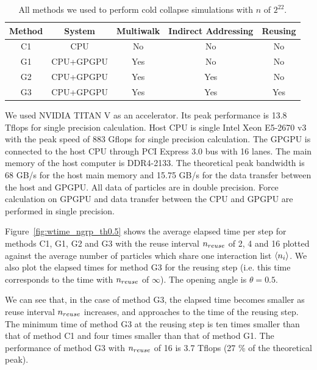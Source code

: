 \documentclass[dvipdfmx]{pasj01}
\begin{document}
\begin{table}
  \begin{tabular}{ccccc}
    \toprule
     Method    & System   & Multiwalk  & Indirect Addressing & Reusing \\
     \midrule
     C1        & CPU        & No         & No               & No        \\
     G1        & CPU+GPGPU  & Yes        & No               & No        \\
     G2        & CPU+GPGPU  & Yes        & Yes              & No       \\
     G3        & CPU+GPGPU  & Yes        & Yes              & Yes       \\
  \bottomrule
  \end{tabular}
  \caption{All methods we used to perform cold collapse simulations
    with $n$ of $2^{22}$.}
  \label{tab:all_method}
\end{table}

We used NVIDIA TITAN V as an accelerator. Its peak performance is 13.8
Tflops for single precision calculation. Host CPU is single Intel Xeon
E5-2670 v3 with the peak speed of 883 Gflops for single precision
calculation. The GPGPU is connected to the host CPU through PCI
Express 3.0 bus with 16 lanes. The main memory of the host computer is
DDR4-2133. The theoretical peak bandwidth is 68 GB/s for the host main
memory and 15.75 GB/s for the data transfer between the host and
GPGPU. All data of particles are in double precision. Force
calculation on GPGPU and data transfer between the CPU and GPGPU are
performed in single precision.

Figure~\ref{fig:wtime_ngrp_th0.5} shows the average elapsed time per
step for methods C1, G1, G2 and G3 with the reuse interval $n_{\rm
  reuse}$ of 2, 4 and 16 plotted against the average number of
particles which share one interaction list $\langle n_{\rm i}
\rangle$. We also plot the elapsed times for method G3 for the reusing
step (i.e. this time corresponds to the time with $n_{\rm reuse}$ of
$\infty$). The opening angle is $\theta=0.5$.

We can see that, in the case of method G3, the elapsed time becomes
smaller as reuse interval $n_{\rm reuse}$ increases, and approaches to
the time of the reusing step. The minimum time of method G3 at the
reusing step is ten times smaller than that of method C1 and four
times smaller than that of method G1. The performance of method G3
with $n_{\rm reuse}$ of 16 is 3.7 Tflops (27 \% of the theoretical
peak).
\end{document}
